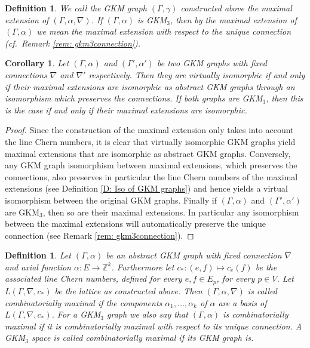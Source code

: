 \documentclass[12pt,a4paper]{amsart}
\newcommand{\ZZ}{\mathbb{Z}}
\newtheorem{cor}[thm]{Corollary}
\theoremstyle{plain}
\newtheorem{defn}[thm]{Definition}
\theoremstyle{definition}
\begin{document}
\begin{defn}\label{def comb maximal}
We call the GKM graph $(\Gamma,\gamma)$ constructed above the \emph{maximal extension} of
$(\Gamma,\alpha ,\nabla)$. If $(\Gamma,\alpha)$ is GKM$_3$, then by
the maximal extension of $(\Gamma,\alpha)$ we mean the maximal extension with respect to
the unique connection (cf.\ Remark \ref{rem: gkm3connection}).
\end{defn}

\begin{cor}\label{virtual iso and max extensions}
 Let $(\Gamma,\alpha)$ and $(\Gamma', \alpha')$ be two GKM graphs
with fixed connections $\nabla$ and $\nabla'$ respectively. Then they are virtually
isomorphic if and only if their maximal extensions are isomorphic as abstract GKM graphs
through an isomorphism which preserves the connections. If both graphs
are GKM$_3$, then this is the case if and only if their maximal extensions are
isomorphic.
\end{cor}
\begin{proof}
Since the construction of the maximal extension only takes into account the line Chern numbers, it is clear that virtually isomorphic GKM graphs yield maximal extensions that are isomorphic as abstract GKM graphs. 
Conversely, any GKM graph isomorphism between maximal extensions,
which preserves the connections, also preserves in particular the
line Chern numbers of the maximal extensions (see Definition \ref{D: Iso of GKM graphs})
and hence yields a virtual isomorphism between the original GKM graphs.
Finally if $(\Gamma,\alpha)$ and $(\Gamma',\alpha')$ are GKM$_3$, then
so are their maximal extensions. In particular any isomorphism between the maximal
extensions will automatically preserve the unique connection (see Remark \ref{rem:
gkm3connection}).
\end{proof}


\begin{defn}\label{def combinatorially maximal}
Let $(\Gamma,\alpha)$ be an abstract GKM graph with fixed connection $\nabla$ and axial function
$\alpha\colon E\rightarrow\ZZ^k$. Furthermore let $c_*\colon (e,f)\mapsto c_e(f)$ be the
associated line Chern numbers, defined for every $e,f\in E_p$, for every $p\in V$. Let
$L(\Gamma,\nabla,c_*)$ be the lattice as constructed above. Then $(\Gamma,\alpha,\nabla)$
is called \emph{combinatorially maximal} if the components $\alpha_1,\ldots,\alpha_k$ of
$\alpha$ are a basis of $L(\Gamma,\nabla,c_*)$. For a GKM$_3$ graph we
also say that $(\Gamma,\alpha)$ is combinatorially maximal if it is combinatorially
maximal with respect to its unique connection. A GKM$_3$ space is called combinatorially
maximal if its GKM graph is.
\end{defn}
\end{document}
